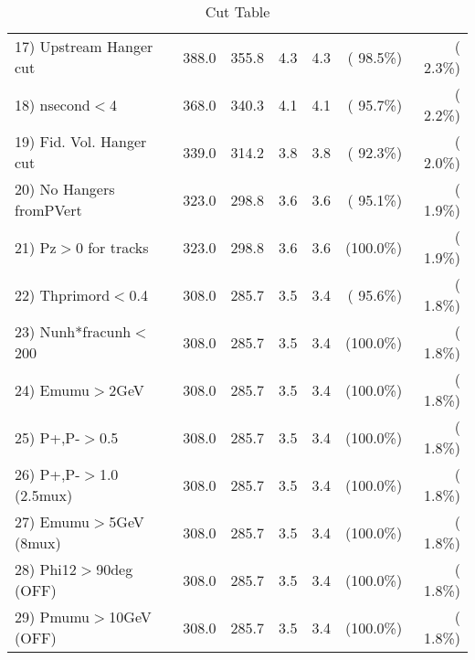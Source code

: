 \begin{table}[h!]
\begin{tabular}{||l||r|r|r|r|r|r||}
 17) Upstream Hanger cut  &        388.0 &        355.8 &          4.3 &          4.3 & ( 98.5\%) & (  2.3\%) \\
 18) nsecond$<$4          &        368.0 &        340.3 &          4.1 &          4.1 & ( 95.7\%) & (  2.2\%) \\
 19) Fid. Vol. Hanger cut &        339.0 &        314.2 &          3.8 &          3.8 & ( 92.3\%) & (  2.0\%) \\
 20) No Hangers fromPVert &        323.0 &        298.8 &          3.6 &          3.6 & ( 95.1\%) & (  1.9\%) \\
 21) Pz$>$0 for tracks    &        323.0 &        298.8 &          3.6 &          3.6 & (100.0\%) & (  1.9\%) \\
 22) Thprimord$<$0.4      &        308.0 &        285.7 &          3.5 &          3.4 & ( 95.6\%) & (  1.8\%) \\
 23) Nunh*fracunh$<$200   &        308.0 &        285.7 &          3.5 &          3.4 & (100.0\%) & (  1.8\%) \\
 24) Emumu$>$2GeV         &        308.0 &        285.7 &          3.5 &          3.4 & (100.0\%) & (  1.8\%) \\
 25) P+,P-$>$0.5          &        308.0 &        285.7 &          3.5 &          3.4 & (100.0\%) & (  1.8\%) \\
 26) P+,P-$>$1.0 (2.5mux) &        308.0 &        285.7 &          3.5 &          3.4 & (100.0\%) & (  1.8\%) \\
 27) Emumu$>$5GeV  (8mux) &        308.0 &        285.7 &          3.5 &          3.4 & (100.0\%) & (  1.8\%) \\
 28) Phi12$>$90deg  (OFF) &        308.0 &        285.7 &          3.5 &          3.4 & (100.0\%) & (  1.8\%) \\
 29) Pmumu$>$10GeV  (OFF) &        308.0 &        285.7 &          3.5 &          3.4 & (100.0\%) & (  1.8\%) \\
 \hline
 \hline
 \end{tabular}
 \caption{Cut Table           }
 \label{tab-cutcohjpsi-mumu_cohpip}
 \end{table}
